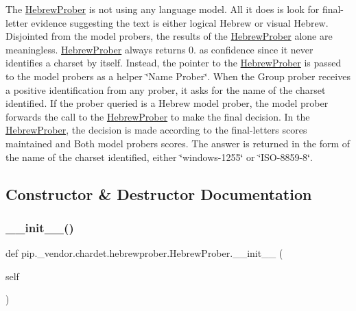The \hyperlink{classpip_1_1__vendor_1_1chardet_1_1hebrewprober_1_1HebrewProber}{Hebrew\+Prober} is not using any language model. All it does is look for final-\/letter evidence suggesting the text is either logical Hebrew or visual Hebrew. Disjointed from the model probers, the results of the \hyperlink{classpip_1_1__vendor_1_1chardet_1_1hebrewprober_1_1HebrewProber}{Hebrew\+Prober} alone are meaningless. \hyperlink{classpip_1_1__vendor_1_1chardet_1_1hebrewprober_1_1HebrewProber}{Hebrew\+Prober} always returns 0. as confidence since it never identifies a charset by itself. Instead, the pointer to the \hyperlink{classpip_1_1__vendor_1_1chardet_1_1hebrewprober_1_1HebrewProber}{Hebrew\+Prober} is passed to the model probers as a helper \char`\"{}\+Name Prober\char`\"{}. When the Group prober receives a positive identification from any prober, it asks for the name of the charset identified. If the prober queried is a Hebrew model prober, the model prober forwards the call to the \hyperlink{classpip_1_1__vendor_1_1chardet_1_1hebrewprober_1_1HebrewProber}{Hebrew\+Prober} to make the final decision. In the \hyperlink{classpip_1_1__vendor_1_1chardet_1_1hebrewprober_1_1HebrewProber}{Hebrew\+Prober}, the decision is made according to the final-\/letters scores maintained and Both model probers scores. The answer is returned in the form of the name of the charset identified, either \char`\"{}windows-\/1255\char`\"{} or \char`\"{}\+I\+S\+O-\/8859-\/8\char`\"{}. 

\subsection{Constructor \& Destructor Documentation}
\mbox{\label{classpip_1_1__vendor_1_1chardet_1_1hebrewprober_1_1HebrewProber_a17a019e7728fc0c21aeba2cd87acb16f}} 
\subsubsection{\texorpdfstring{\+\_\+\+\_\+init\+\_\+\+\_\+()}{\_\_init\_\_()}}
{\footnotesize\ttfamily def pip.\+\_\+vendor.\+chardet.\+hebrewprober.\+Hebrew\+Prober.\+\_\+\+\_\+init\+\_\+\+\_\+ (\begin{DoxyParamCaption}\item[{}]{self }\end{DoxyParamCaption})}



